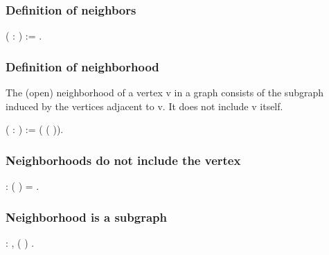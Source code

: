 \subsubsection{Definition of neighbors}


\begin{coqdoccode}
\coqdocemptyline
\coqdocnoindent
{}  ( : )  :=   .\coqdoceol
\coqdocemptyline
\end{coqdoccode}
\subsubsection{Definition of neighborhood}

 The (open) neighborhood of a vertex v in a graph consists of the
    subgraph induced by the vertices adjacent to v.  It does not
    include v itself.
\begin{coqdoccode}
\coqdocemptyline
\coqdocnoindent
{}  ( : )  :=   (  (  )).\coqdoceol
\coqdocemptyline
\end{coqdoccode}
\subsubsection{Neighborhoods do not include the vertex}


\begin{coqdoccode}
\coqdocemptyline
\coqdocnoindent
{}    :   (  ) = .\coqdoceol
\coqdocemptyline
\end{coqdoccode}
\subsubsection{Neighborhood is a subgraph}


\begin{coqdoccode}
\coqdocemptyline
\coqdocnoindent
{}  : \coqdockw{\ensuremath{\forall}}  ,  (  ) .\coqdoceol
\coqdocemptyline
\end{coqdoccode}
